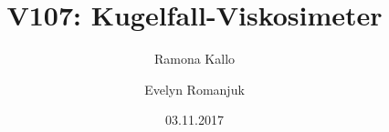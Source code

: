 


\title{V107: Kugelfall-Viskosimeter}
\author{Ramona Kallo \and Evelyn Romanjuk}
\date{03.11.2017}
\maketitle 
\newpage
\tableofcontents
\newpage




\nocite{*}
\printbibliography

